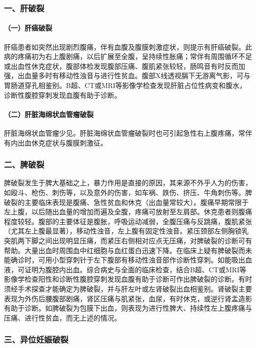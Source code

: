 \subsubsection{一、肝破裂}

\paragraph{（一）肝癌破裂}

肝癌患者如突然出现剧烈腹痛，伴有血腹及腹膜刺激症状，则提示有肝癌破裂。此病的疼痛初为右上腹剧痛，以后扩展至全腹，呈持续性胀痛；常伴有周围循环不足或出血性休克症状，腹部体检发现腹部压痛、腹肌紧张较轻，肠鸣音有时反而加强，出血量多时有移动性浊音与进行性贫血。腹部X线透视膈下无游离气影，可与胃肠道穿孔相鉴别。B超、CT或MRI等影像学检查发现肝脏占位性病变和腹水，诊断性腹腔穿刺发现血腹有助于诊断。

\paragraph{（二）肝脏海绵状血管瘤破裂}

肝脏海绵状血管瘤少见。肝脏海绵状血管瘤破裂时也可引起急性右上腹疼痛，常伴有内出血休克症状与腹膜刺激征。

\subsubsection{二、脾破裂}

脾破裂发生于脾大基础之上，暴力作用是直接的原因，其来源不外乎人为的伤害，如殴斗、枪伤、刺伤等，以及意外的伤害，如车祸、跌伤、挤压、牛角刺伤等。脾破裂的主要临床表现是腹痛、急性贫血和休克（出血量常较大）。腹痛早期常限于左上腹，以后随出血量的增加而遍及全腹，疼痛可放射至左肩部。休克患者则腹痛程度较轻。腹部的主要体征是腹胀，呼吸运动减弱，全腹压痛与反跳痛，腹肌紧张（尤其左上腹最显著），移动性浊音，左上腹有固定性浊音。紧压颈部左侧胸锁乳突肌两下脚之间出现明显压痛，而紧压右侧相对应点无压痛，对脾破裂的诊断可有帮助。大量出血时周围血中红细胞与血红蛋白迅速下降。在临床上疑有脾破裂而未能确诊时，可用小型穿刺针于左下腹部有移动性浊音部作诊断性穿刺。如能吸出血液，可证明为腹腔内出血。综合病史与全面的临床检查，结合B超、CT或MRI等影像学检查阳性和诊断性腹腔穿刺发现血腹有助于诊断可作出脾破裂的诊断。有时须经手术探查才能确定为脾破裂，并与肝左叶或左肾破裂出血相鉴别。肾破裂主要表现为外伤后腰腹部剧痛，肾区压痛与肌紧张，血尿，有时休克，或逆行肾盂造影有助于诊断。如脾破裂为包膜下出血，则表现为进行性脾大、持续性左上腹疼痛与压痛、进行性贫血，而无上述的情况。

\subsubsection{三、异位妊娠破裂}

